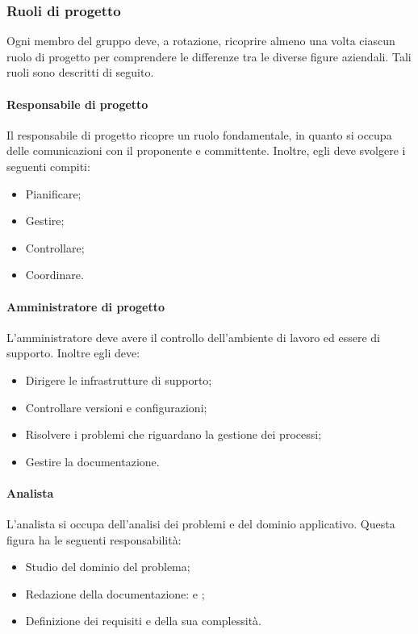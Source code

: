 \subsubsection{Ruoli di progetto}
Ogni membro del gruppo deve, a rotazione, ricoprire almeno una volta ciascun ruolo di progetto per comprendere le differenze tra le diverse figure aziendali. Tali ruoli sono descritti di seguito.

\paragraph{Responsabile di progetto}
Il responsabile di progetto ricopre un ruolo fondamentale, in quanto si occupa delle comunicazioni con il proponente e committente. Inoltre, egli deve svolgere i seguenti compiti:
\begin{itemize}
\item Pianificare;
\item Gestire;
\item Controllare;
\item Coordinare.
\end{itemize}

\paragraph{Amministratore di progetto}
L'amministratore deve avere il controllo dell'ambiente di lavoro ed essere di supporto. Inoltre egli deve: 
\begin{itemize}
\item Dirigere le infrastrutture di supporto;
\item Controllare versioni e configurazioni;
\item Risolvere i problemi che riguardano la gestione dei processi;
\item Gestire la documentazione.
\end{itemize}

\paragraph{Analista}
L'analista si occupa dell'analisi dei problemi e del dominio applicativo. Questa figura ha le seguenti responsabilità:
\begin{itemize}
\item Studio del dominio del problema; 
\item Redazione della documentazione: \AdR{} e \SdF{};
\item Definizione dei requisiti e della sua complessità.
\end{itemize}

